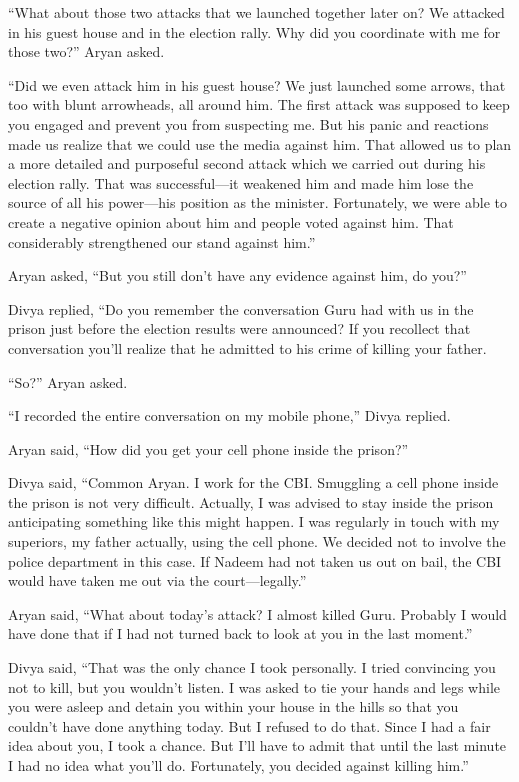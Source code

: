 “What about those two attacks that we launched together later on? We attacked in
his guest house and in the election rally. Why did you coordinate with me for
those two?” Aryan asked.

“Did we even attack him in his guest house? We just launched some arrows, that
too with blunt arrowheads, all around him. The first attack was supposed to keep
you engaged and prevent you from suspecting me. But his panic and reactions made
us realize that we could use the media against him. That allowed us to plan a
more detailed and purposeful second attack which we carried out during his
election rally. That was successful—it weakened him and made him lose the
source of all his power—his position as the minister. Fortunately, we were
able to create a negative opinion about him and people voted against him. That
considerably strengthened our stand against him.”

Aryan asked, “But you still don't have any evidence against him, do you?”

Divya replied, “Do you remember the conversation Guru had with us in the prison
just before the election results were announced? If you recollect that
conversation you'll realize that he admitted to his crime of killing your
father.

“So?” Aryan asked.

“I recorded the entire conversation on my mobile phone,” Divya replied.

Aryan said, “How did you get your cell phone inside the prison?”

Divya said, “Common Aryan. I work for the CBI. Smuggling a cell phone inside the
prison is not very difficult. Actually, I was advised to stay inside the prison
anticipating something like this might happen. I was regularly in touch with my
superiors, my father actually, using the cell phone. We decided not to involve
the police department in this case. If Nadeem had not taken us out on bail, the
CBI would have taken me out via the court—legally.”

Aryan said, “What about today's attack? I almost killed Guru. Probably I would
have done that if I had not turned back to look at you in the last moment.”

Divya said, “That was the only chance I took personally. I tried convincing you
not to kill, but you wouldn't listen. I was asked to tie your hands and legs
while you were asleep and detain you within your house in the hills so that you
couldn't have done anything today. But I refused to do that. Since I had a fair
idea about you, I took a chance. But I'll have to admit that until the last
minute I had no idea what you'll do. Fortunately, you decided against killing
him.”

